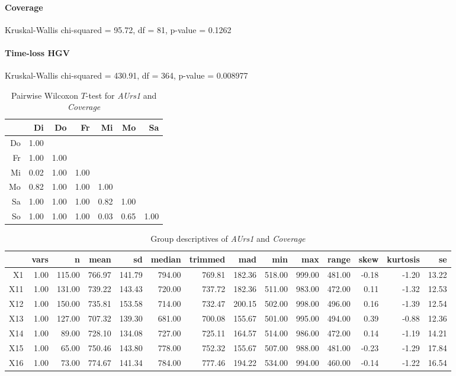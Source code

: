 \paragraph{Coverage}
Kruskal-Wallis chi-squared = 95.72, df = 81, p-value = 0.1262

\paragraph{Time-loss HGV}
Kruskal-Wallis chi-squared = 430.91, df = 364, p-value = 0.008977

\begin{table}[ht]
	\small
	\centering
    \begin{tabular}{rrrrrrr}
		\hline
		& Di & Do & Fr & Mi & Mo & Sa \\ 
		\hline
		Do & 1.00 &  &  &  &  &  \\ 
		Fr & 1.00 & 1.00 &  &  &  &  \\ 
		Mi & 0.02 & 1.00 & 1.00 &  &  &  \\ 
		Mo & 0.82 & 1.00 & 1.00 & 1.00 &  &  \\ 
		Sa & 1.00 & 1.00 & 1.00 & 0.82 & 1.00 &  \\ 
		So & 1.00 & 1.00 & 1.00 & 0.03 & 0.65 & 1.00 \\ 
		\hline
	\end{tabular}
    \caption{Pairwise Wilcoxon $T$-test for \textit{AUrs1} and \textit{Coverage}}
    \label{tbl:wilcoxon_baysis_initiator_AUrs1_Cov}
\end{table}
\begin{table}[ht]
	\small
	\centering
    \begin{tabular}{rrrrrrrrrrrrrr}
		\hline
		& vars & n & mean & sd & median & trimmed & mad & min & max & range & skew & kurtosis & se \\ 
		\hline
		X1 & 1.00 & 115.00 & 766.97 & 141.79 & 794.00 & 769.81 & 182.36 & 518.00 & 999.00 & 481.00 & -0.18 & -1.20 & 13.22 \\ 
		X11 & 1.00 & 131.00 & 739.22 & 143.43 & 720.00 & 737.72 & 182.36 & 511.00 & 983.00 & 472.00 & 0.11 & -1.32 & 12.53 \\ 
		X12 & 1.00 & 150.00 & 735.81 & 153.58 & 714.00 & 732.47 & 200.15 & 502.00 & 998.00 & 496.00 & 0.16 & -1.39 & 12.54 \\ 
		X13 & 1.00 & 127.00 & 707.32 & 139.30 & 681.00 & 700.08 & 155.67 & 501.00 & 995.00 & 494.00 & 0.39 & -0.88 & 12.36 \\ 
		X14 & 1.00 & 89.00 & 728.10 & 134.08 & 727.00 & 725.11 & 164.57 & 514.00 & 986.00 & 472.00 & 0.14 & -1.19 & 14.21 \\ 
		X15 & 1.00 & 65.00 & 750.46 & 143.80 & 778.00 & 752.32 & 155.67 & 507.00 & 988.00 & 481.00 & -0.23 & -1.29 & 17.84 \\ 
		X16 & 1.00 & 73.00 & 774.67 & 141.34 & 784.00 & 777.46 & 194.22 & 534.00 & 994.00 & 460.00 & -0.14 & -1.22 & 16.54 \\ 
		\hline
	\end{tabular}
    \caption{Group descriptives of \textit{AUrs1} and \textit{Coverage}}
    \label{tbl:descriptives_baysis_initiator_AUrs1_Cov}
\end{table}


